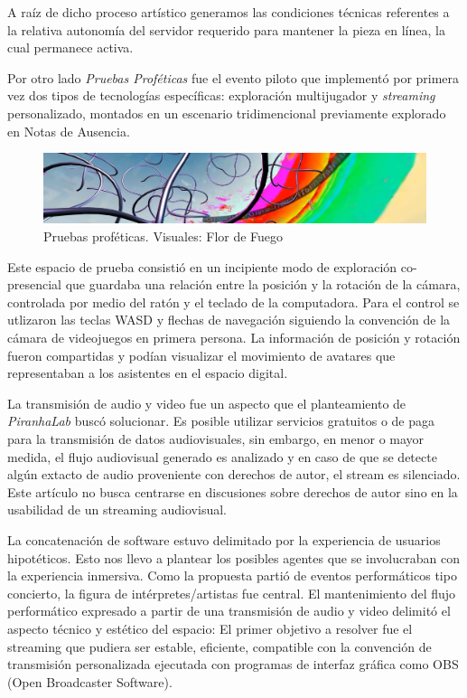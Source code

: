 A raíz de dicho proceso artístico generamos las condiciones técnicas referentes a la relativa autonomía del servidor requerido para mantener la pieza en línea, la cual permanece activa.

Por otro lado \textit{Pruebas Proféticas} fue el evento piloto que implementó por primera vez dos tipos de tecnologías específicas: exploración multijugador y \textit{streaming} personalizado, montados en un escenario tridimencional previamente explorado en Notas de Ausencia. 

\begin{figure}[H]
  \includegraphics[width=\textwidth]{img/pruebasprofeticas.jpg}
  \caption{Pruebas proféticas. Visuales: Flor de Fuego}
\end{figure}

Este espacio de prueba consistió en un incipiente modo de exploración co-presencial que guardaba una relación entre la posición y la rotación de la cámara, controlada por medio del ratón y el teclado de la computadora. Para el control se utlizaron las teclas WASD y flechas de navegación siguiendo la convención de la cámara de videojuegos en primera persona. La información de posición y rotación fueron compartidas y podían visualizar el movimiento de avatares que representaban a los asistentes en el espacio digital. 

La transmisión de audio y video fue un aspecto que el planteamiento de \textit{PiranhaLab} buscó solucionar. Es posible utilizar servicios gratuitos o de paga para la transmisión de datos audiovisuales, sin embargo, en menor o mayor medida, el flujo audiovisual generado es analizado y en caso de que se detecte algún extacto de audio proveniente con derechos de autor, el stream es silenciado. Este artículo no busca centrarse en discusiones sobre derechos de autor sino en la usabilidad de un streaming audiovisual. 

La concatenación de software estuvo delimitado por la experiencia de usuarios hipotéticos. Esto nos llevo a plantear los posibles agentes que se involucraban con la experiencia inmersiva. Como la propuesta partió de eventos performáticos tipo concierto, la figura de intérpretes/artistas fue central. El mantenimiento del flujo performático expresado a partir de una transmisión de audio y video delimitó el aspecto técnico y estético del espacio: El primer objetivo a resolver fue el streaming que pudiera ser estable, eficiente, compatible con la convención de transmisión personalizada ejecutada con programas de interfaz gráfica como OBS (Open Broadcaster Software).

